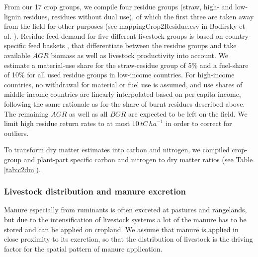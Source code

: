 \documentclass[gc, manuscript]{copernicus}
\begin{document}
From our 17 crop groups, we compile four residue groups (straw, high- and low-lignin residues, residues without dual use), of which the first three are taken away from the field for other purposes (see mappingCrop2Residue.csv in Bodirsky et al. \citeyearpar{bodirsky_mrcommons_2020}). Residue feed demand for five different livestock groups is based on country-specific feed baskets \citep[see][]{weindl_livestock_2017}, that differentiate between the residue groups and take available \(AGR\) biomass as well as livestock productivity into account. We estimate a material-use share for the straw-residue group of 5\% and a fuel-share of 10\% for all used residue groups in low-income countries. For high-income countries, no withdrawal for material or fuel use is assumed, and use shares of middle-income countries are linearly interpolated based on per-capita income, following the same rationale as for the share of burnt residues described above. The remaining \(AGR\) as well as all \(BGR\) are expected to be left on the field. We limit high residue return rates to at most \(10\,\unit{tC\,ha}^{-1}\) in order to correct for outliers.

To transform dry matter estimates into carbon and nitrogen, we compiled crop-group and plant-part specific carbon and nitrogen to dry matter ratios (see Table \ref{tab:c2dm}).

\hypertarget{sec:livstmanure}{%
\subsubsection{Livestock distribution and manure excretion}\label{sec:livstmanure}}

Manure especially from ruminants is often excreted at pastures and rangelands, but due to the intensification of livestock systems a lot of the manure has to be stored and can be applied on cropland. We assume that manure is applied in close proximity to its excretion, so that the distribution of livestock is the driving factor for the spatial pattern of manure application.
\end{document}
